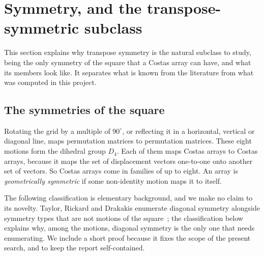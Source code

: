 \documentclass[11pt,a4paper]{article}
\theoremstyle{definition}
\begin{document}
\section{Symmetry, and the transpose-symmetric subclass}\label{sec:symmetry}
This section explains why transpose symmetry is the natural subclass to study, being the only symmetry of the square that a Costas array can have, and what its members look like. It separates what is known from the literature from what was computed in this project.


\subsection{The symmetries of the square}

Rotating the grid by a multiple of $90^\circ$, or reflecting it in a horizontal, vertical or
diagonal line, maps permutation matrices to permutation matrices. These eight motions form
the dihedral group $D_4$. Each of them maps Costas arrays to Costas arrays, because it maps
the set of displacement vectors one-to-one onto another set of vectors. So Costas arrays come
in families of up to eight. An array is \emph{geometrically symmetric} if some non-identity motion maps it
to itself.

The following classification is elementary background, and we make no claim to its novelty.
Taylor, Rickard and Drakakis enumerate diagonal symmetry alongside symmetry types that are not
motions of the square~\cite{taylor2009}; the classification below explains why, among the motions,
diagonal symmetry is the only one that needs enumerating. We include a short proof because it fixes the scope of the present search, and to keep
the report self-contained.
\end{document}
